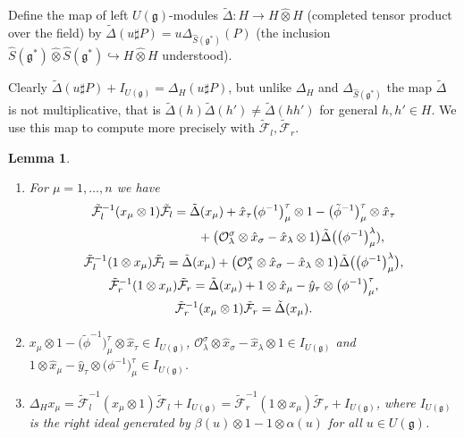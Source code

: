 \documentclass[pdftex]{sigma}
\def\gg{\mathfrak{g}}
\def\hx{\hat{x}}
\def\hy{\hat{y}}
\newtheorem{Lemma}[Theorem]{Lemma}
\numberwithin{equation}{section}
\begin{document}
\begin{Definition}
Define the map of left $U(\gg)$-modules $\tilde\Delta\colon H\to H\hat\otimes H$ (completed tensor product over the field) by $\tilde\Delta(u\sharp P) = u\Delta_{\hat{S}(\gg^*)}(P)$ (the inclusion $\hat{S}(\gg^*)\hat\otimes\hat{S}(\gg^*)\hookrightarrow H\hat\otimes H$ understood).
\end{Definition}
\begin{Remark}\label{rem:tDDH}
Clearly $\tilde\Delta(u\sharp P)+I_{U(\gg)} = \Delta_H(u\sharp P)$, but unlike $\Delta_H$ and $\Delta_{\hat{S}(\gg^*)}$ the map $\tilde\Delta$ is not multiplicative, that is $\tilde\Delta(h)\tilde\Delta(h')\neq\tilde\Delta(h h')$ for general $h,h'\in H$. We use this map to compute more precisely with $\tilde{\mathcal{F}}_l, \tilde{\mathcal{F}}_r$.
\end{Remark}
\begin{Lemma}\label{lem:DeltaFx}\quad
\begin{enumerate}\itemsep=0pt
\item[$(i)$] For $\mu = 1,\dots, n$ we have
\begin{gather}
\tilde{\mathcal{F}}_l^{-1}(x_\mu\otimes 1)\tilde{\mathcal{F}}_l = \tilde\Delta(x_\mu)
+ \hx_\tau\big(\phi^{-1}\big)^\tau_\mu\otimes 1 - \big(\tilde\phi^{-1}\big)^\tau_\mu\otimes\hx_\tau\nonumber\\
\hphantom{\tilde{\mathcal{F}}_l^{-1}(x_\mu\otimes 1)\tilde{\mathcal{F}}_l =}{}
+ \big(\mathcal{O}^\sigma_\lambda\otimes\hx_\sigma-\hx_\lambda\otimes 1\big)\tilde\Delta\big(\big(\phi^{-1}\big)^\lambda_\mu),\label{eq:tFLx1FL}
\\
\label{eq:tFL1xFL}
\tilde{\mathcal{F}}_l^{-1}(1\otimes x_\mu)\tilde{\mathcal{F}}_l =
\tilde\Delta(x_\mu)+\big(\mathcal{O}^\sigma_\lambda\otimes\hx_\sigma-\hx_\lambda\otimes 1\big)\tilde\Delta\big(\big(\phi^{-1}\big)^\lambda_\mu\big),
\\ \label{eq:tFR1xFR}
\tilde{\mathcal{F}}_r^{-1}(1\otimes x_\mu)\tilde{\mathcal{F}}_r = \tilde\Delta(x_\mu)+1\otimes\hx_\mu - \hy_\tau\otimes\big(\phi^{-1}\big)^\tau_\mu,
\\ \label{eq:tFRx1FR}
\tilde{\mathcal{F}}_r^{-1}(x_\mu\otimes 1)\tilde{\mathcal{F}}_r = \tilde\Delta(x_\mu).
\end{gather}

\item[$(ii)$] $x_\mu\otimes 1 - \big(\tilde\phi^{-1}\big)^\tau_\mu\otimes\hat{x}_\tau\in I_{U(\gg)}$,
$\mathcal{O}^\sigma_\lambda\otimes\hx_\sigma-\hx_\lambda\otimes 1\in I_{U(\gg)}$
and $1\otimes\hx_\mu - \hy_\tau\otimes\big(\phi^{-1}\big)^\tau_\mu\in I_{U(\gg)}$.

\item[$(iii)$] $\Delta_H x_\mu = \tilde{\mathcal{F}}_l^{-1}(x_\mu\otimes 1)\tilde{\mathcal{F}}_l + I_{U(\gg)}
= \tilde{\mathcal{F}}_r^{-1}(1\otimes x_\mu)\tilde{\mathcal{F}}_r + I_{U(\gg)}$,
where $I_{U(\gg)}$ is the right ideal generated by $\beta(u)\otimes 1 - 1\otimes \alpha(u)$ for all $u\in U(\gg)$.
\end{enumerate}
\end{Lemma}
\end{document}
